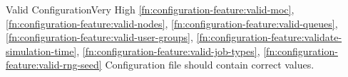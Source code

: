 	\begin{functional}{Valid Configuration}{Very High}
		{
			\ref{fn:configuration-feature:valid-moc},
			\ref{fn:configuration-feature:valid-nodes},
			\ref{fn:configuration-feature:valid-queues},
			\ref{fn:configuration-feature:valid-user-groups},
			\ref{fn:configuration-feature:validate-simulation-time},
			\ref{fn:configuration-feature:valid-job-types},
			\ref{fn:configuration-feature:valid-rng-seed}
		}
		\label{fn:configuration-feature:valid-configuration}
		{
			Configuration file should contain correct values.
		}
	\end{functional}
	